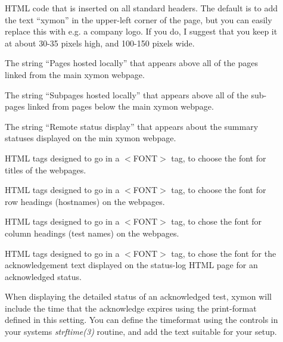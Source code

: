  \begin{description}

\item[] HTML code that is inserted on all standard
  headers. The default is to add the text ``xymon'' in the upper-left
  corner of the page, but you can easily replace this with e.g. a
  company logo. If you do, I suggest that you keep it at about 30-35
  pixels high, and 100-150 pixels wide. 


 

\item[] The string ``Pages hosted locally'' that
  appears above all of the pages linked from the main xymon webpage. 


 

\item[] The string ``Subpages hosted locally''
  that appears above all of the sub-pages linked from pages below the
  main xymon webpage. 


 

\item[] The string ``Remote status display'' that
  appears about the summary statuses displayed on the min xymon
  webpage. 


 

\item[] HTML tags designed to go in a $<$FONT$>$ tag,
  to choose the font for titles of the webpages. 


 

\item[] HTML tags designed to go in a $<$FONT$>$
  tag, to choose the font for row headings (hostnames) on the
  webpages. 


 

\item[] HTML tags designed to go in a $<$FONT$>$
  tag, to chose the font for column headings (test names) on the
  webpages. 


 

\item[] HTML tags designed to go in a $<$FONT$>$
  tag, to chose the font for the acknowledgement text displayed on the
  status-log HTML page for an acknowledged status. 


 

\item[] When displaying the detailed status of an
  acknowledged test, xymon will include the time that the acknowledge
  expires using the print-format defined in this setting. You can
  define the timeformat using the controls in your systems
  \emph{strftime(3)} routine, and add the text suitable for your
  setup. 



\end{description}
